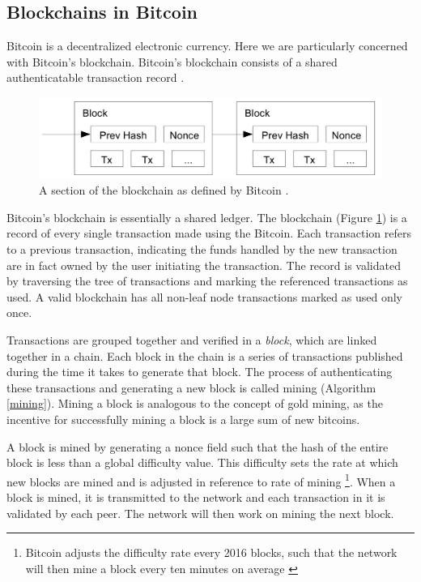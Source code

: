 \documentclass[11pt]{IEEEtran} %
\begin{document}
\subsection{Blockchains in Bitcoin}
Bitcoin is a decentralized electronic currency. 
Here we are particularly concerned with Bitcoin's blockchain. Bitcoin's blockchain consists of a shared authenticatable transaction record \cite{namecoin}  \cite{bitcoin} .


\begin{figure}
    \includegraphics[width=\linewidth]{blockchain}
    \caption{A section of the blockchain as defined by Bitcoin \cite{bitcoin}.}
    \label{blockchain}
\end{figure}


Bitcoin's blockchain is essentially a shared ledger.  The blockchain (Figure \ref{blockchain}) is a record of every single transaction made using the Bitcoin. Each transaction refers to  a previous transaction, indicating the funds handled by the new transaction are in fact owned by the user initiating the transaction. The record is validated by traversing the tree of transactions and marking the referenced transactions as used. A valid blockchain has all non-leaf node transactions marked as used only once.


Transactions are grouped together and verified in a \emph{block}, which are linked together in a chain.  Each block in the chain is a series of transactions published during the time it takes to generate that block. The process of authenticating these transactions and generating a new block is called mining (Algorithm \ref{mining}).  Mining a block is analogous to the concept of gold mining, as the incentive for successfully mining a block is a large sum of new bitcoins.  

A block is mined by generating a nonce field such that the hash of the entire block is less than a global difficulty value. This difficulty sets the rate at which new blocks are mined and is adjusted in reference to rate of mining \footnote{Bitcoin adjusts the difficulty rate every 2016 blocks, such that the network will then mine a block every ten minutes on average \cite{bitdiff}}.  When a block is mined, it is transmitted to the network and each transaction in it is validated by each peer. The network will then work on mining the next block.
\end{document}

